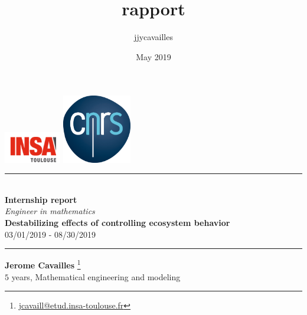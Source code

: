 \documentclass{article}
\title{rapport}
\author{jjycavailles }
\date{May 2019}
\begin{document}
\begin{titlepage}

\begin{center}
  \includegraphics[width = 25mm]{LogoInsa.png} \hfill
  \includegraphics[width = 30mm]{logo_cnrs.jpg}
\end{center}





\vspace*{1cm}

\begin{center}
\rule{\linewidth}{0.7mm} \\
[0.4cm]
\textbf{ \Huge Internship report} \\
[0.2cm]
\large \emph{Engineer in mathematics} \\ 
[0.6cm]
\textbf{ \huge Destabilizing effects of controlling ecosystem behavior} \\
[0.4cm]
03/01/2019 - 08/30/2019 \\
[0.4cm]
\rule{\linewidth}{0.7mm}
\end{center}

\vspace*{0.5cm}

\begin{center}
\textbf{\Large{Jerome Cavailles}} \footnote{\url{jcavaill@etud.insa-toulouse.fr}} \\ [0.3cm] $5$ years, Mathematical engineering and modeling %
\end{center}


\end{titlepage}
\end{document}
